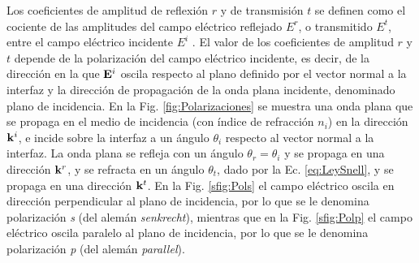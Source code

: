 Los coeficientes de amplitud de reflexión $r$ y de transmisión $t$ se definen como el cociente de las amplitudes del campo eléctrico reflejado $E^r$, o transmitido $E^t$, entre el campo eléctrico incidente $E^i$ . El valor de los coeficientes de amplitud $r$ y $t$ depende de la polarización del campo eléctrico incidente, es decir, de la dirección en la que $\vb{E}^i$ oscila respecto al plano definido por el vector normal a la interfaz y la dirección de propagación de la onda plana incidente, denominado plano de incidencia. En la Fig. \ref{fig:Polarizaciones} se muestra una onda plana que se propaga en el medio de incidencia (con índice de refracción $n_i$) en la dirección $\vb{k}^i$, e incide sobre la interfaz a un ángulo $\theta_i$ respecto al vector normal a la interfaz. La onda plana se refleja con un ángulo $\theta_r = \theta_i$ y se propaga en una dirección $\vb{k}^r$, y se refracta en un ángulo $\theta_t$, dado por la Ec. \eqref{eq:LeySnell}, y se propaga en una dirección $\vb{k}^t$. En la Fig. \ref{sfig:Pols} el campo eléctrico oscila en dirección perpendicular al plano de incidencia, por lo que se le denomina polarización \emph{s} (del alemán \emph{senkrecht}), mientras que en la Fig. \ref{sfig:Polp} el campo eléctrico oscila paralelo al plano de incidencia, por lo que se le denomina polarización \emph{p} (del alemán \emph{parallel}).
%
